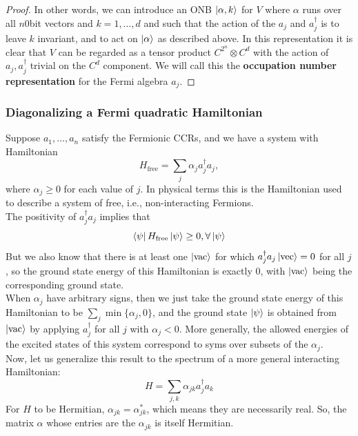 \documentclass{book}
\theoremstyle{definition}
\newcommand{\al}{\alpha}
\begin{document}
\begin{itemize}
\begin{proof}
		In other words, we can introduce an ONB $\ket{\al,k}$ for $V$ where $\al$ runs over all $n$0bit vectors and $k=1,\dots,d$ and such that the action of the $a_j$ and $a_j^\dagger$ is to leave $k$ invariant, and to act on $\ket{\al}$ as described above. In this representation it is clear that $V$ can be regarded as a tensor product $C^{2^n}\otimes C^d$ with the action of $a_j,a_j^\dagger$ trivial on the $C^d$ component. We will call this the \textbf{occupation number representation} for the Fermi algebra $a_j$. 
	\end{proof} 
\end{itemize}


\subsubsection{Diagonalizing a Fermi quadratic Hamiltonian}


Suppose $a_1,\dots,a_n$ satisfy the Fermionic CCRs, and we have a system with Hamiltonian
\begin{equation}
H_{\text{free}} = \sum_j \al_j a_j^\dagger a_j,
\end{equation}
where $\al_j \geq 0$ for each value of $j$. In physical terms this is the Hamiltonian used to describe a system of free, i.e., non-interacting Fermions. \\

The positivity of $a_j^\dagger a_j$ implies that
\begin{equation}
\bra{\psi}H_\text{free}\ket{\psi} \geq 0, \forall \ket{\psi}
\end{equation}
But we also know that there is at least one $\ket{\text{vac}}$ for which $a_j^\dagger a_j \ket{\text{vec}} = 0$ for all $j$, so the ground state energy of this Hamiltonian is exactly 0, with $\ket{\text{vac}}$ being the corresponding ground state.   \\

When $\al_j$ have arbitrary signs, then we just take the ground state energy of this Hamiltonian to be $\sum_j \min\{ \al_j , 0 \}$, and the ground state $\ket{\psi}$ is obtained from $\ket{\text{vac}}$ by applying $a_j^\dagger$ for all $j$ with $\al_j < 0$. More generally, the allowed energies of the excited states of this system correspond to syms over subsets of the $\al_j$. \\


Now, let us generalize this result to the spectrum of a more general interacting Hamiltonian:
\begin{equation}
\boxed{H = \sum_{j,k} \al_{jk} a_j^\dagger a_k}
\end{equation} 
For $H$ to be Hermitian, $\al_{jk} = \al^*_{jk}$, which means they are necessarily real. So, the matrix $\al$ whose entries are the $\al_{jk}$ is itself Hermitian. \\
\end{document}
